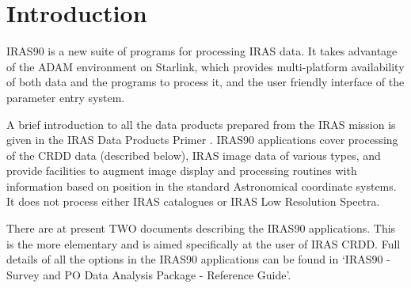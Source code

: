 \documentclass[twoside,11pt]{starlink}
\begin{document}
\scfrontmatter

\section{Introduction
\label{m:intro}}

IRAS90 is a new suite of programs for processing IRAS data. It takes advantage
of the ADAM environment on Starlink, which provides multi-platform availability
of both data and the programs to process it, and the user friendly interface of
the parameter entry system.

A brief introduction to all the data products prepared from the IRAS mission
is given in the IRAS Data Products Primer
. IRAS90 applications cover
processing of the CRDD data (described below), IRAS image data of various types,
and provide facilities to augment image display and processing routines with
information based on position in the standard Astronomical coordinate systems.
It does not process either IRAS catalogues or IRAS Low Resolution Spectra.

There are at present TWO documents describing the IRAS90 applications. This is
the more elementary and is aimed specifically at the user of IRAS CRDD. Full
details of all the options in the IRAS90 applications can be found in
`IRAS90 - Survey and PO Data Analysis Package - Reference Guide'.
\end{document}
